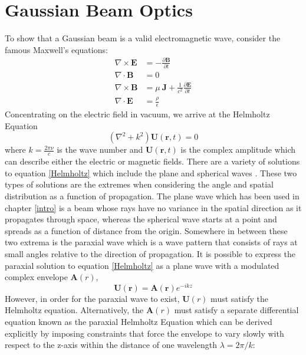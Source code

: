 		\section{Gaussian Beam Optics}
		To show that a Gaussian beam is a valid electromagnetic wave, consider the famous Maxwell's equations:
		\begin{equation}\label{eq:maxwell}
		\begin{aligned}
		 \nabla \times \mathbf{E} &=-\frac{\partial \mathbf{B}} {\partial t}
		\\\nabla \cdot \mathbf{B} &=0				
		\\\nabla \times \mathbf{B} &= \mu\ \mathbf{J} + \frac{1}{c^2} \frac{\partial \mathbf{E}} {\partial t}
		\\
		\nabla \cdot \mathbf{E} &= \frac{\rho}{\epsilon}
		\end{aligned}
		\end{equation}
		Concentrating on the electric field in vacuum, we arrive at the Helmholtz Equation
		\begin{equation}\label{Helmholtz}
		(\nabla^2 + k^2 ) \mathbf{U}(\mathbf{r},t) = 0
		\end{equation}
		where $k=\frac{2\pi\nu}{c}$ is the wave number and $\mathbf{U}(\mathbf{r},t)$ is the complex amplitude which can describe either the electric or magnetic fields.  There are a variety of solutions to equation \ref{Helmholtz} which include the plane and spherical waves \cite{Saleh}.  These two types of solutions are the extremes when considering the angle and spatial distribution as a function of propagation.  The plane wave which has been used in chapter \ref{intro} is a beam whose rays have no variance in the spatial direction as it propagates through space, whereas the spherical wave starts at a point and spreads as a function of distance from the origin. Somewhere in between these two extrema is the paraxial wave which is a wave pattern that consists of rays at small angles relative to the direction of propagation.  It is possible to express the paraxial solution to equation \ref{Helmholtz} as a plane wave with a modulated complex envelope $\mathbf{A}(r)$,
		\begin{equation}
		\mathbf{U}(\mathbf{r}) = \mathbf{A}(\mathbf{r}) e^{-ikz}
		\end{equation}
		However, in order for the paraxial wave to exist, $\mathbf{U}(r)$ must satisfy the Helmholtz equation. Alternatively, the $\mathbf{A}(r)$ must satisfy a separate differential equation known as the paraxial Helmholtz Equation which can be derived explicitly by imposing constraints that force the envelope to vary slowly with respect to the z-axis within the distance of one wavelength $\lambda = 2\pi/k$:

